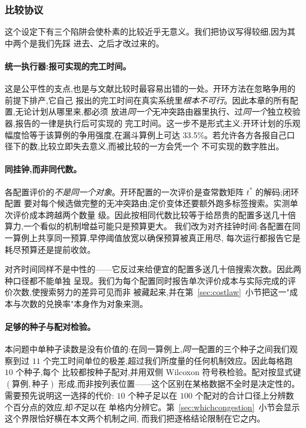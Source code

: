 \documentclass[manuscript,screen,review]{acmart}
\newcommand{\NSeeds}{10}
\newcommand{\NPairs}{100}
\newcommand{\ContentionHi}{33.5\%}
\begin{document}
\subsubsection{比较协议}
\label{sec:protocol}

这个设定下有三个陷阱会使朴素的比较近乎无意义。我们把协议写得较细,因为其中两个是我们先踩
进去、之后才改过来的。

\paragraph{统一执行器:报可实现的完工时间。}
这是公平性的支点,也是与文献比较时最容易出错的一处。开环方法在忽略争用的前提下排产,它自己
报出的完工时间在真实系统里\emph{根本不可行}。因此本章的所有配置,无论计划从哪里来,都必须
放进\emph{同一个}无冲突路由器里执行、过\emph{同一个}独立校验器,报告的一律是执行后可实现的
完工时间。这一步不是形式主义:开环计划的乐观幅度恰等于该算例的争用强度,在漏斗算例上可达
\ContentionHi{}。若允许各方各报自己口径下的数,比较立即失去意义,而被比较的一方会凭一个
不可实现的数字胜出。

\paragraph{同挂钟,而非同代数。}
各配置评价的\emph{不是同一个对象}。开环配置的一次评价是查常数矩阵 $t^{*}$ 的解码;闭环配置
要对每个候选做完整的无冲突路由;定价变体还要额外跑多标签搜索。实测单次评价成本跨越两个数量
级。因此按相同代数比较等于给昂贵的配置多送几十倍算力,一个看似的机制增益可能只是预算更大。
我们改为对齐挂钟时间:各配置在同一算例上共享同一预算,早停阈值放宽以确保预算被真正用尽,
每次运行都报告它是耗尽预算还是提前收敛。

对齐时间同样不是中性的——它反过来给便宜的配置多送几十倍搜索次数。因此两种口径都不能单独
呈现。我们为每个配置同时报告单次评价成本与实际完成的评价次数,使搜索努力的差异可见而非
被藏起来,并在第~\ref{sec:costlaw}~小节把这一"成本与次数的兑换率"本身作为对象来测。

\paragraph{足够的种子与配对检验。}
本问题中单种子读数是没有价值的:在同一算例上,\emph{同一}配置的三个种子之间我们观察到过
$11$ 个完工时间单位的极差,超过我们所度量的任何机制效应。因此每格跑 $\NSeeds$ 个种子,每个
比较都按种子配对,并用双侧 Wilcoxon 符号秩检验。配对按显式键 $(\text{算例},\text{种子})$
形成,而非按列表位置——这个区别在某格数据不全时是决定性的。需要预先说明这一选择的代价:
$\NSeeds$ 个种子足以在 $\NPairs$ 个配对的合计口径上分辨数个百分点的效应,却\emph{不}足以在
单格内分辨它。第~\ref{sec:whichcongestion}~小节会显示这个界限恰好横在本文两个机制之间,
而我们把逐格结论限制在它之内。
\end{document}
